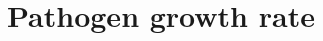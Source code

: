 \documentclass{article}
\newcommand{\md}{\mathrm{d}}
\begin{document}


\section{Pathogen growth rate}
\end{document}

